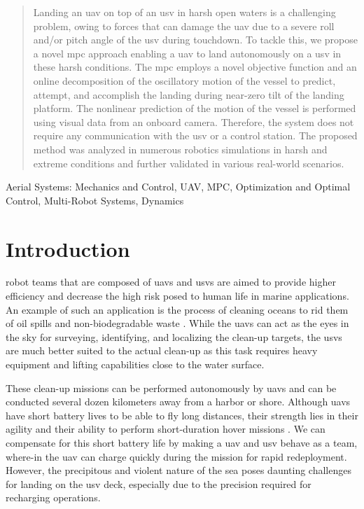\documentclass[letterpaper, 10 pt, journal, twoside]{IEEEtran}
\begin{document}
\begin{abstract}
Landing an \ac{uav} on top of an \ac{usv} in harsh open waters is a challenging problem, owing to forces that can damage the \ac{uav} due to a severe roll and/or pitch angle of the \ac{usv} during touchdown. To tackle this, we propose a novel \ac{mpc} approach enabling a \ac{uav} to land autonomously on a \ac{usv} in these harsh conditions. The \ac{mpc} employs a novel objective function and an online decomposition of the oscillatory motion of the vessel to predict, attempt, and accomplish the landing during near-zero tilt of the landing platform. The nonlinear prediction of the motion of the vessel is performed using visual data from an onboard camera. Therefore, the system does not require any communication with the \ac{usv} or a control station. The proposed method was analyzed in numerous robotics simulations in harsh and extreme conditions and further validated in various real-world scenarios.
\end{abstract}

\begin{IEEEkeywords}
Aerial Systems: Mechanics and Control, UAV, MPC, Optimization and Optimal Control, Multi-Robot Systems, Dynamics
\end{IEEEkeywords}

\section{Introduction}
 robot teams that are composed of \acp{uav} and \acp{usv} are aimed to provide higher efficiency and decrease the high risk posed to human life in marine applications. An example of such an application is the process of cleaning oceans to rid them of oil spills and non-biodegradable waste \cite{lebreton2017river}. While the \acp{uav} can act as the eyes in the sky for surveying, identifying, and localizing the clean-up targets, the \acp{usv} are much better suited to the actual clean-up as this task requires heavy equipment and lifting capabilities close to the water surface. 

These clean-up missions can be performed autonomously by \acp{uav} and can be conducted several dozen kilometers away from a harbor or shore. Although \acp{uav} have short battery lives to be able to fly long distances, their strength lies in their agility and their ability to perform short-duration hover missions \cite{nascimento2019position}. We can compensate for this short battery life by making a \ac{uav} and \ac{usv} behave as a team, where-in the \ac{uav} can charge quickly during the mission for rapid redeployment. However, the precipitous and violent nature of the sea poses daunting challenges for landing on the \ac{usv} deck, especially due to the precision required for recharging operations. 
\end{document}
